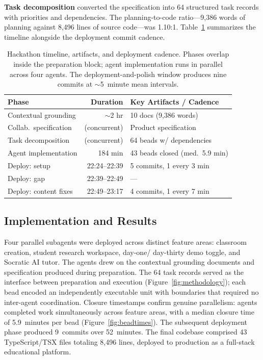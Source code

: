 \textbf{Task decomposition} converted the specification into 64 structured
task records with priorities and dependencies. The planning-to-code
ratio---9,386 words of planning against 8,496 lines of source code---was
1.10:1. Table~\ref{tab:timeline} summarizes the timeline alongside the
deployment commit cadence.

\begin{table}[t]
  \centering
  \caption{Hackathon timeline, artifacts, and deployment cadence. Phases
    overlap inside the preparation block; agent implementation runs in
    parallel across four agents. The deployment-and-polish window
    produces nine commits at $\sim$5~minute mean intervals.}
  \label{tab:timeline}
  \footnotesize
  \begin{tabular}{@{}lrl@{}}
    \toprule
    \textbf{Phase} & \textbf{Duration} & \textbf{Key Artifacts / Cadence} \\
    \midrule
    Contextual grounding   & $\sim$2 hr      & 10 docs (9,386 words) \\
    Collab.\ specification & (concurrent)    & Product specification \\
    Task decomposition     & (concurrent)    & 64 beads w/ dependencies \\
    Agent implementation   & 184 min         & 43 beads closed (med.\ 5.9 min) \\
    \midrule
    Deploy: setup        & 22:24--22:39    & 5 commits, 1 every 3 min \\
    Deploy: gap          & 22:39--22:49    & --- \\
    Deploy: content fixes & 22:49--23:17    & 4 commits, 1 every 7 min \\
    \bottomrule
  \end{tabular}
\end{table}

\subsection{Implementation and Results}

Four parallel subagents were deployed across distinct feature areas:
classroom creation, student research workspace, day-one/\allowbreak
day-thirty demo toggle, and Socratic AI tutor. The agents drew on the
contextual grounding documents and specification produced during
preparation. The 64 task records served as the interface between
preparation and execution (Figure~\ref{fig:methodology}); each bead
encoded an independently executable unit with boundaries that required
no inter-agent coordination. Closure timestamps confirm genuine
parallelism: agents completed work simultaneously across feature
areas, with a median closure time of 5.9~minutes per bead
(Figure~\ref{fig:beadtimes}). The subsequent deployment phase produced
9~commits over 52~minutes. The final codebase comprised 43
TypeScript/TSX files totaling 8,496 lines, deployed to production as a
full-stack educational platform.

